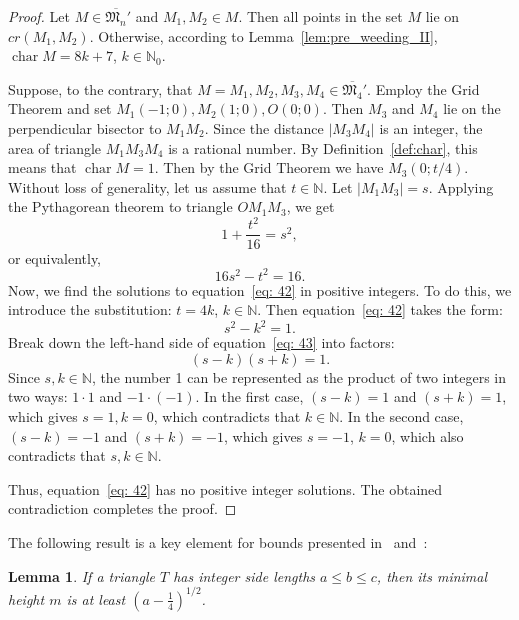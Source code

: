 \documentclass[a4paper,14pt]{article} %
\theoremstyle{plain}
\newtheorem{lemma}[theorem]{Lemma}
\theoremstyle{definition}
\begin{document}
\begin{proof}
	Let $M \in \overline{\mathfrak{M}_n}'$ and $M_1, M_2 \in M$.
	Then all points in the set $M$ lie on $cr(M_1, M_2)$.
	Otherwise, according to Lemma~\ref{lem:pre_weeding_II}, $\operatorname{char}{M}={8k+7}$, $k\in \mathbb{N}_0$.

	Suppose, to the contrary, that $M={M_1, M_2, M_3, M_4} \in \overline{\mathfrak{M}_4}'$.
	Employ the Grid Theorem and set $M_1(-1;0), M_2(1;0), O(0;0)$.
	Then $M_3$ and $M_4$ lie on the perpendicular bisector to $M_1M_2$.
	Since the distance $|M_3M_4|$ is an integer, the area of triangle $M_1M_3M_4$ is a rational number.
	By Definition~\ref{def:char}, this means that $\operatorname{char}{M}={1}$.
	Then by the Grid Theorem we have $M_3(0;t/4)$. Without loss of generality, let us assume that $t\in\mathbb{N}$. Let $|M_1M_3|=s$. Applying the Pythagorean theorem to triangle $OM_1M_3$, we get
	$$
	1+\frac{t^2}{16}=s^2,
	$$
	or equivalently,
	\begin{equation}
	\label{eq: 42}
	16s^2-t^2=16.
	\end{equation}
	Now, we find the solutions to equation~\eqref{eq: 42} in positive integers.
	To do this, we introduce the substitution: $t=4k$, $k\in\mathbb{N}$.
	Then equation~\eqref{eq: 42} takes the form:
	\begin{equation}
	\label{eq: 43}
	s^2-k^2=1.
	\end{equation}
	Break down the left-hand side of equation~\eqref{eq: 43} into factors:
	\begin{equation}
	\label{eq: 44}
	(s-k)(s+k)=1.
	\end{equation}
	Since $s,k\in\mathbb{N}$, the number 1 can be represented as the product of two integers in two ways: $1\cdot1$ and $-1\cdot(-1)$. In the first case, $(s-k)=1$ and $(s+k)=1$, which gives $s=1,k=0$, which contradicts that $k\in\mathbb{N}$.
	In the second case, $(s-k)=-1$ and $(s+k)=-1$, which gives $s=-1$, $k=0$, which also contradicts that $s,k\in\mathbb{N}$.

	Thus, equation~\eqref{eq: 42} has no positive integer solutions.
	The obtained contradiction completes the proof.
\end{proof}

The following result is a key element for bounds presented
in~\cite{solymosi2003note} and~\cite{my-semi-general-5-4-bound-2019}:

\begin{lemma}
	\cite[Observation 1]{solymosi2003note}
	If a triangle $T$ has integer side lengths $a \leq b \leq c$,
	then its minimal height $m$ is at least $\left(a - \frac{1}{4}\right)^{1/2}$.
\end{lemma}
\end{document}
